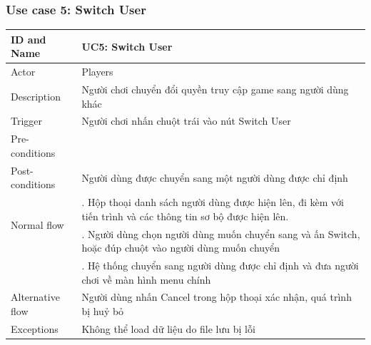 \subsubsection{Use case 5: Switch User}
\begin{center}
	\begin{tabular}{|l|p{12cm}|}
		\hline
		ID and Name & UC5: Switch User \\
		\hline
		Actor  & Players \\
		\hline
		Description  & Người chơi chuyển đổi quyền truy cập game sang người dùng khác\\
		\hline
		Trigger  & Người chơi nhấn chuột trái vào nút Switch User\\
		\hline
		Pre-conditions & \\
		\hline
		Post-conditions  & Người dùng được chuyển sang một người dùng được chỉ định\\
		\hline
		\multirow{2}{*}{Normal flow}      &\qquad 1. Hộp thoại danh sách người dùng được hiện lên, đi kèm với tiến trình và các thông tin sơ bộ được hiện lên. \\
		&\qquad 2. Người dùng chọn người dùng muốn chuyển sang và ấn Switch, hoặc đúp chuột vào người dùng muốn chuyển\\
		&\qquad 3. Hệ thống chuyển sang người dùng được chỉ định và đưa người chơi về màn hình menu chính\\
		\hline
		Alternative flow  & Người dùng nhấn Cancel trong hộp thoại xác nhận, quá trình bị huỷ bỏ\\
		\hline
		Exceptions  & Không thể load dữ liệu do file lưu bị lỗi\\
		\hline
	\end{tabular}
\end{center}
